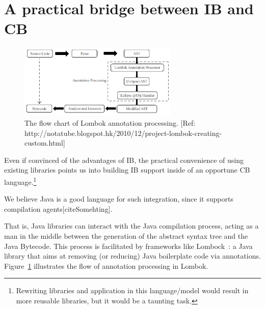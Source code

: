 \section{A practical bridge between IB and CB}

\begin{figure}[t]\label{fig:lombok}
\centering
\includegraphics[width=3in]{pdfs/lombok.png}
\caption{The flow chart of Lombok annotation processing. [Ref: http://notatube.blogspot.hk/2010/12/project-lombok-creating-custom.html]
}
\end{figure}

Even if convinced of the advantages of IB,
the practical convenience
of using existing libraries points us into building IB support
inside of an opportune CB language.\footnote{
Rewriting libraries and application in this language/model
would result in more reusable libraries, but it would be a taunting task.}


We believe Java is a good language for such integration, since it supports compilation agents[citeSomehting].

That is, Java libraries can interact with the Java compilation process,
acting as a man in the middle between the 
generation of the abstract syntax tree and the Java Bytecode.
This process is facilitated by frameworks like Lombock~\cite{lombok}:
a Java library that aims at removing (or
reducing) Java boilerplate code via
annotations.
Figure~\ref{fig:lombok} illustrates the
flow of \mixin annotation processing in Lombok.

